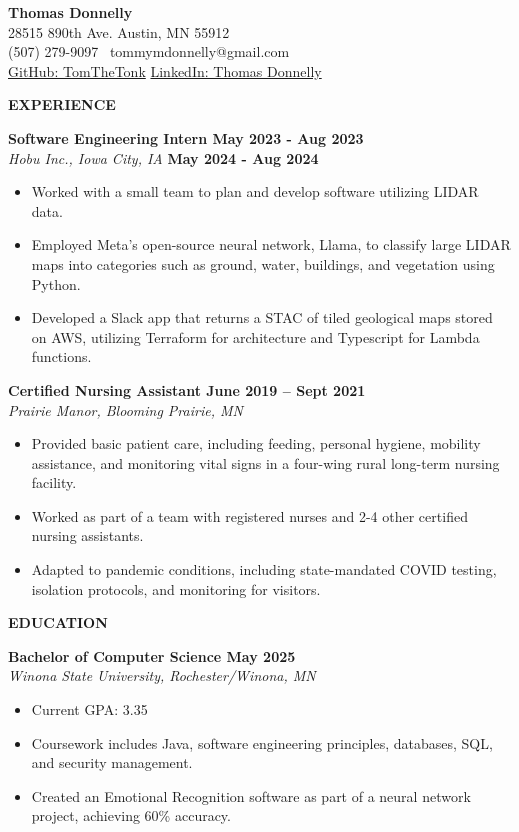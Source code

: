 \textbf{Thomas Donnelly}\\
28515 890th Ave. \textbar{} Austin, MN 55912\\
(507) 279-9097 \textbar~tommymdonnelly@gmail.com\\
\href{https://github.com/TomTheTonk}{GitHub: TomTheTonk}
\href{http://linkedin.com/in/thomas-donnelly-429405320}{LinkedIn: Thomas
Donnelly}

\textbf{EXPERIENCE}

\textbf{Software Engineering Intern May 2023 - Aug 2023}\\
\emph{Hobu Inc., Iowa City, IA} \textbf{May 2024 - Aug 2024}

\begin{itemize}
\item
  Worked with a small team to plan and develop software utilizing LIDAR
  data.
\item
  Employed Meta's open-source neural network, Llama, to classify large
  LIDAR maps into categories such as ground, water, buildings, and
  vegetation using Python.
\item
  Developed a Slack app that returns a STAC of tiled geological maps
  stored on AWS, utilizing Terraform for architecture and Typescript for
  Lambda functions.
\end{itemize}

\textbf{Certified Nursing Assistant June 2019 -- Sept 2021}\\
\emph{Prairie Manor, Blooming Prairie, MN}

\begin{itemize}
\item
  Provided basic patient care, including feeding, personal hygiene,
  mobility assistance, and monitoring vital signs in a four-wing rural
  long-term nursing facility.
\item
  Worked as part of a team with registered nurses and 2-4 other
  certified nursing assistants.
\item
  Adapted to pandemic conditions, including state-mandated COVID
  testing, isolation protocols, and monitoring for visitors.
\end{itemize}

\textbf{EDUCATION}

\textbf{Bachelor of Computer Science May 2025}\\
\emph{Winona State University, Rochester/Winona, MN}

\begin{itemize}
\item
  Current GPA: 3.35
\item
  Coursework includes Java, software engineering principles, databases,
  SQL, and security management.
\item
  Created an Emotional Recognition software as part of a neural network
  project, achieving 60\% accuracy.
\end{itemize}

